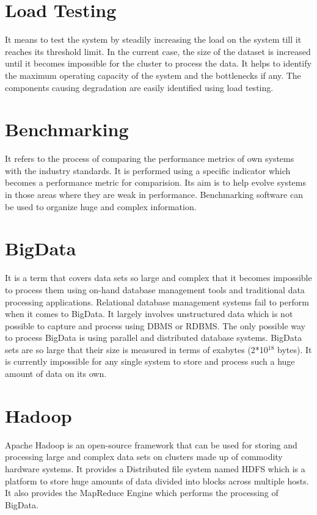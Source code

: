 \documentclass[12pt]{book}
\begin{document}
\section{Load Testing}
It means to test the system by steadily increasing the load on the system till it reaches its threshold limit. In the current case, 
the size of the dataset is increased until it becomes impossible for the cluster to process the data. It helps to identify the maximum 
operating capacity of the system and the bottlenecks if any. The components causing degradation are easily identified using load testing.
\\\noindent
\section{Benchmarking}
It refers to the process of comparing the performance metrics of own systems with the industry standards. It is performed using 
a specific indicator which becomes a performance metric for comparision. Its aim is to help evolve systems in those areas where they are
weak in performance. Benchmarking software can be used to organize huge and complex information.
\\\noindent
\section{BigData}
It is a term that covers data sets so large and complex that it becomes impossible to process them using on-hand database management tools and 
traditional data processing applications. Relational database management systems fail to perform when it comes to BigData. It largely involves
unstructured data which is not possible to capture and process using DBMS or RDBMS. The only possible way to process BigData is using 
parallel and distributed database systems. BigData sets are so large that their size is measured in terms of exabytes (2*10$^{18}$ bytes).
It is currently impossible for any single system to store and process such a huge amount of data on its own.
\section{Hadoop}
Apache Hadoop is an open-source framework that can be used for storing  and processing large and complex data sets on clusters made up of
commodity hardware systems. It provides a Distributed file system named HDFS which is a platform to store huge amounts of data  divided into 
blocks across multiple hosts. It also provides the MapReduce Engine which performs the processing of BigData.
\\\noindent
\end{document}
